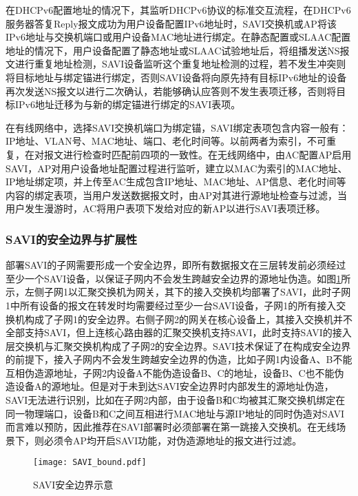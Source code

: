       在DHCPv6配置地址的情况下，其监听DHCPv6协议的标准交互流程，在DHCPv6服务器答复Reply报文成功为用户设备配置IPv6地址时，SAVI交换机或AP将该IPv6地址与交换机端口或用户设备MAC地址进行绑定\cite{RFC7513}。在静态配置或SLAAC配置地址的情况下，用户设备配置了静态地址或SLAAC试验地址后，将组播发送NS报文进行重复地址检测，SAVI设备监听这个重复地址检测的过程，若不发生冲突则将目标地址与绑定锚进行绑定\cite{RFC7219,RFC6620}，否则SAVI设备将向原先持有目标IPv6地址的设备再次发送NS报文以进行二次确认，若能够确认应答则不发生表项迁移，否则将目标IPv6地址迁移为与新的绑定锚进行绑定的SAVI表项。

      在有线网络中，选择SAVI交换机端口为绑定锚，SAVI绑定表项包含内容一般有：IP地址、VLAN号、MAC地址、端口、老化时间等。以前两者为索引，不可重复，在对报文进行检查时匹配前四项的一致性。在无线网络中，由AC配置AP启用SAVI，AP对用户设备地址配置过程进行监听，建立以MAC为索引的MAC地址、IP地址绑定项，并上传至AC生成包含IP地址、MAC地址、AP信息、老化时间等内容的绑定表项，当用户发送数据报文时，由AP对其进行源地址检查与过滤，当用户发生漫游时，AC将用户表项下发给对应的新AP以进行SAVI表项迁移。

      \subsubsection{SAVI的安全边界与扩展性}
      \label{survey:sava:access:bound}
      部署SAVI的子网需要形成一个安全边界，即所有数据报文在三层转发前必须经过至少一个SAVI设备，以保证子网内不会发生跨越安全边界的源地址伪造。如图\ref{fig:SAVI_bound}所示，左侧子网1以汇聚交换机为网关，其下的接入交换机均部署了SAVI，此时子网1中所有设备的报文在转发时均需要经过至少一台SAVI设备，子网1的所有接入交换机构成了子网1的安全边界。右侧子网2的网关在核心设备上，其接入交换机并不全部支持SAVI，但上连核心路由器的汇聚交换机支持SAVI，此时支持SAVI的接入层交换机与汇聚交换机构成了子网2的安全边界。SAVI技术保证了在构成安全边界的前提下，接入子网内不会发生跨越安全边界的伪造，比如子网1内设备A、B不能互相伪造源地址，子网2内设备A不能伪造设备B、C的地址，设备B、C也不能伪造设备A的源地址。但是对于未到达SAVI安全边界时内部发生的源地址伪造，SAVI无法进行识别，比如在子网2内部，由于设备B和C均被其汇聚交换机绑定在同一物理端口，设备B和C之间互相进行MAC地址与源IP地址的同时伪造对SAVI而言难以预防，因此推荐在SAVI部署时必须部署在第一跳接入交换机。在无线场景下，则必须令AP均开启SAVI功能，对伪造源地址的报文进行过滤。
      \begin{figure}[ht]
        \centering
        \texttt{[image: SAVI\_bound.pdf]}
        \caption{SAVI安全边界示意}
        \label{fig:SAVI_bound}
      \end{figure}

